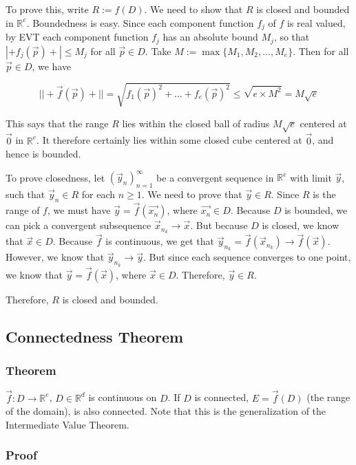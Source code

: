 \documentclass[11 pt, twoside]{article}
\begin{document}
To prove this, write $R := f(D)$. We need to show that $R$ is closed and bounded
in $\mathbb{R}^e$. Boundedness is easy. Since each component function $f_j$
of $f$ is real valued, by EVT each component function $f_j$ has an absolute
bound $M_j$, so that $|+f_j(\vec{p})+| \leq M_j$ for all $\vec{p} \in D$. 
Take $M := \max\{M_1, M_2, \dots, M_e\}$. Then for all $\vec{p} \in D$, we have

$$||+\vec{f}(\vec{p})+|| = \sqrt{f_1(\vec{p})^2 + \dots + f_e(\vec{p})^2} \leq
\sqrt{e \times M^2} = M \sqrt{e}$$

This says that the range $R$ lies within the closed ball of radius $M\sqrt{e}$
centered at $\vec{0}$ in $\mathbb{R}^e$. It therefore certainly lies within
some closed cube centered at $\vec{0}$, and hence is bounded.

To prove closedness, let $(\vec{y}_n)_{n = 1}^\infty$ be a convergent sequence in
$\mathbb{R}^e$ with limit $\vec{y}$, such that $\vec{y}_n \in R$ for each $n
\geq 1$. We need to prove that $\vec{y} \in R$. Since $R$ is the range of $f$,
we must have $\vec{y} = \vec{f}(\vec{x_n})$, where $\vec{x_n} \in D$. Because
$D$ is bounded, we can pick a convergent subsequence $\vec{x}_{n_k} \to
\vec{x}$. But because $D$ is closed, we know that $\vec{x} \in D$. Because
$\vec{f}$ is continuous, we get that $\vec{y}_{n_k} = \vec{f}(\vec{x}_{n_k}) \to
\vec{f}(\vec{x})$. However, we know that $\vec{y}_{n_k} \to \vec{y}$. But since
each sequence converges to one point, we know that $\vec{y} = \vec{f}(\vec{x})$,
where $\vec{x} \in D$. Therefore, $\vec{y} \in R$.

Therefore, $R$ is closed and bounded.

\subsection{Connectedness Theorem}

\subsubsection{Theorem}

$\vec{f}: D \to \mathbb{R}^e$, $D \in \mathbb{R}^d$ is continuous on $D$.
If $D$ is connected, $E = \vec{f}(D)$ (the range of the domain), is also
connected. Note that this is the generalization of the Intermediate Value
Theorem.

\subsubsection{Proof}
\end{document}
